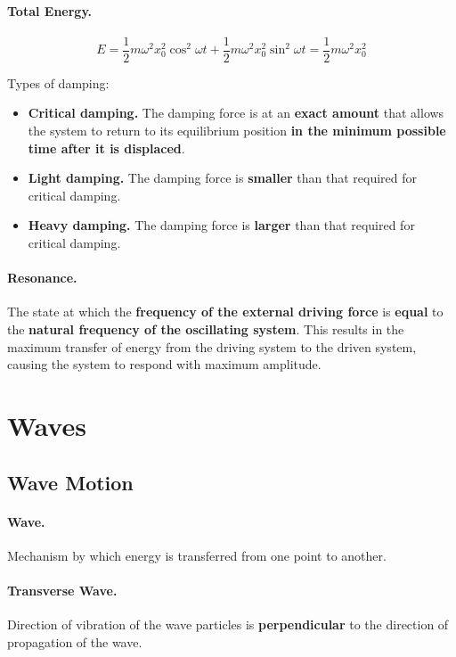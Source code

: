 \documentclass{article}
\begin{document}
\paragraph{Total Energy.} \begin{equation}
E = \frac{1}{2}m\omega^2 x_0^2\cos^2\omega t + \frac{1}{2}m\omega^2 x_0^2\sin^2\omega t = \frac{1}{2}m\omega^2 x_0^2
\end{equation}

Types of damping: \begin{itemize}
\item \textbf{Critical damping.} The damping force is at an \textbf{exact amount} that allows the system to return to its equilibrium position \textbf{in the minimum possible time after it is displaced}.
\item \textbf{Light damping.} The damping force is \textbf{smaller} than that required for critical damping.
\item \textbf{Heavy damping.} The damping force is \textbf{larger} than that required for critical damping.
\end{itemize}

\paragraph{Resonance.} The state at which the \textbf{frequency of the external driving force} is \textbf{equal} to the \textbf{natural frequency of the oscillating system}. This results in the maximum transfer of energy from the driving system to the driven system, causing the system to respond with maximum amplitude.

\section{Waves}

\subsection{Wave Motion}

\paragraph{Wave.} Mechanism by which energy is transferred from one point to another.

\paragraph{Transverse Wave.} Direction of vibration of the wave particles is \textbf{perpendicular} to the direction of propagation of the wave.
\end{document}
